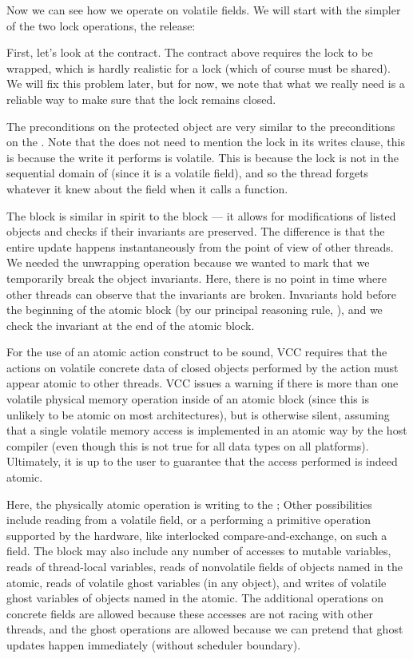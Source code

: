 Now we can see how we operate on volatile fields.
We will start with the simpler of the two lock operations, the release:


\noindent
First, let's look at the contract.
The contract above requires the lock to be wrapped, which is
hardly realistic for a lock (which of course must be shared). We will
fix this problem later, but for now, we note that what we really need
is a reliable way to make sure that the lock remains closed.


The preconditions on the protected object are very similar to the
preconditions on the .
Note that the  does not need to mention the lock in its writes clause,
this is because the write it performs is volatile.
This is because the lock is not in the sequential domain of \vcc{\me}
(since it is a volatile field), and so the thread forgets whatever it
knew about the field when it calls a function. 

The  block is similar in spirit to the  block ---
it allows for modifications of listed objects and checks if their invariants
are preserved.
The difference is that the entire update happens instantaneously from the point
of view of other threads.
We needed the unwrapping operation because we wanted to mark that we temporarily
break the object invariants.
Here, there is no point in time where other threads can observe that the invariants
are broken.
Invariants hold before the beginning of the atomic block (by our principal reasoning
rule, ), and we check the invariant at the end of the atomic block.

For the use of an atomic action construct to be sound, VCC requires
that the actions on volatile concrete data of closed objects performed
by the action must appear atomic to other threads.  VCC issues a
warning if there is more than one volatile physical memory operation
inside of an atomic block (since this is unlikely to be atomic on most
architectures), but is otherwise silent, assuming that a single
volatile memory access is implemented in an atomic way by the host
compiler (even though this is not true for all data types on all
platforms). Ultimately,  it is up to the user to
guarantee that the access performed is indeed atomic.

Here, the physically atomic operation is writing to the ; Other
possibilities include reading from a volatile field, or a performing a
primitive operation supported by the hardware, like interlocked
compare-and-exchange, on such a field.  The block may also include any
number of accesses to mutable variables, reads of thread-local
variables, reads of nonvolatile fields of objects named in the atomic,
reads of volatile ghost variables (in any object), and writes of
volatile ghost variables of objects named in the atomic. The
additional operations on concrete fields are allowed because these
accesses are not racing with other threads, and the ghost operations
are allowed because we can pretend that ghost updates happen
immediately (without scheduler boundary).

